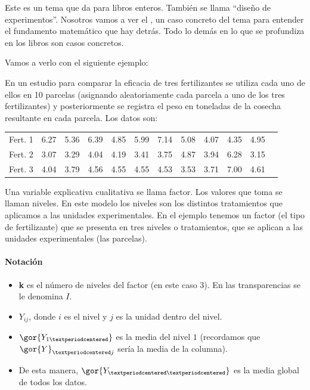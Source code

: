Este es un tema que da para libros enteros. También se llama ``diseño de experimentos''. Nosotros vamos a ver el , un caso concreto del tema para entender el fundamento matemático que hay detrás. Todo lo demás en lo que se profundiza en los libros son casos concretos.

Vamos a verlo con el siguiente ejemplo:

En un estudio para comparar la eficacia de tres fertilizantes se utiliza
cada uno de ellos en 10 parcelas (asignando aleatoriamente cada parcela
a uno de los tres fertilizantes) y posteriormente se registra el peso en
toneladas de la cosecha resultante en cada parcela. Los datos son:

\begin{center}
\begin{tabular}{|c|ccccccccccc|}
\hline
	Fert. 1 & 6.27 & 5.36 & 6.39 & 4.85 & 5.99 & 7.14 & 5.08 & 4.07 & 4.35 & 4.95\\
	Fert. 2 & 3.07 & 3.29 & 4.04 & 4.19 & 3.41 & 3.75 & 4.87 & 3.94 & 6.28 & 3.15\\
	Fert. 3 & 4.04 & 3.79 & 4.56 & 4.55 & 4.55 & 4.53 & 3.53 & 3.71 & 7.00 & 4.61\\\hline
\end{tabular}
\end{center}



Una variable explicativa cualitativa se llama factor. Los valores que toma se llaman niveles. En este modelo los niveles son los distintos tratamientos que aplicamos a las unidades experimentales. En el ejemplo tenemos un factor (el tipo de fertilizante) que se presenta en tres niveles o tratamientos, que se aplican a las unidades experimentales (las parcelas).


\paragraph{Notación}
\begin{itemize}
\item \textbf{k} es el número de niveles del factor (en este caso 3). En las transparencias se le denomina $I$.
\item $Y_{ij}$, donde $i$ es el nivel y $j$ es la unidad dentro del nivel.
\item $\gor{Y_{1·}}$ es la media del nivel $1$ (recordamos que $\gor{Y}_{·j}$ sería la media de la columna).
\item De esta manera, $\gor{Y_{··}}$ es la media global de todos los datos.
\end{itemize}

